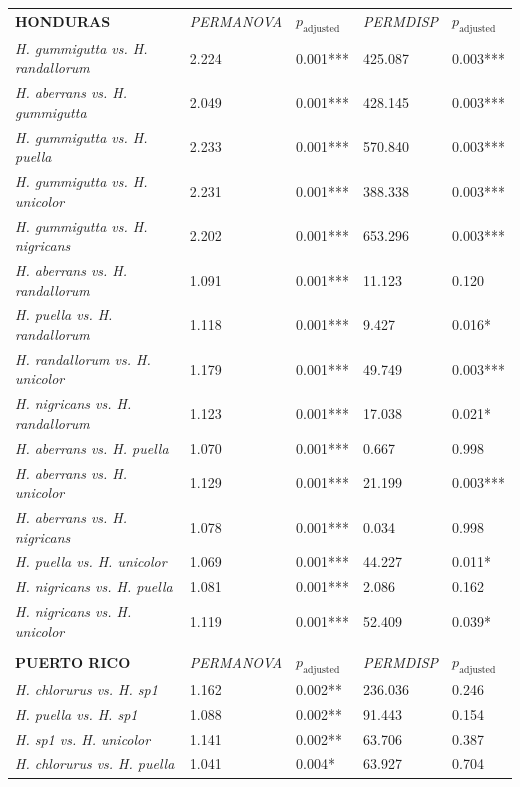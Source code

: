 \begin{xltabular}{\textwidth}{p{4.5cm}*{4}{X}}
\hline \hline
\addlinespace
\textbf{HONDURAS} & \emph{PERMANOVA} & $p_{\text{adjusted}}$ & \emph{PERMDISP} & $p_{\text{adjusted}}$ \\
\addlinespace
\hline \hline
\emph{H. gummigutta vs. H. randallorum} & 2.224 & 0.001*** & 425.087 & 0.003*** \\
\emph{H. aberrans vs. H. gummigutta} & 2.049 & 0.001*** & 428.145 & 0.003*** \\
\emph{H. gummigutta vs. H. puella} & 2.233 & 0.001*** & 570.840 & 0.003*** \\
\emph{H. gummigutta vs. H. unicolor} & 2.231 & 0.001*** & 388.338 & 0.003*** \\
\emph{H. gummigutta vs. H. nigricans} & 2.202 & 0.001*** & 653.296 & 0.003*** \\
\emph{H. aberrans vs. H. randallorum} & 1.091 & 0.001*** & 11.123 & 0.120 \\
\emph{H. puella vs. H. randallorum} & 1.118 & 0.001*** & 9.427 & 0.016* \\
\emph{H. randallorum vs. H. unicolor} & 1.179 & 0.001*** & 49.749 & 0.003*** \\
\emph{H. nigricans vs. H. randallorum} & 1.123 & 0.001*** & 17.038 & 0.021* \\
\emph{H. aberrans vs. H. puella} & 1.070 & 0.001*** & 0.667 & 0.998 \\
\emph{H. aberrans vs. H. unicolor} & 1.129 & 0.001*** & 21.199 & 0.003*** \\
\emph{H. aberrans vs. H. nigricans} & 1.078 & 0.001*** & 0.034 & 0.998 \\
\emph{H. puella vs. H. unicolor} & 1.069 & 0.001*** & 44.227 & 0.011* \\
\emph{H. nigricans vs. H. puella} & 1.081 & 0.001*** & 2.086 & 0.162 \\
\emph{H. nigricans vs. H. unicolor} & 1.119 & 0.001*** & 52.409 & 0.039* \\\\
\hline \hline
\addlinespace
\textbf{PUERTO RICO} & \emph{PERMANOVA} & $p_{\text{adjusted}}$ & \emph{PERMDISP} & $p_{\text{adjusted}}$ \\
\addlinespace
\hline \hline
\emph{H. chlorurus vs. H. sp1} & 1.162 & 0.002** & 236.036 & 0.246 \\
\emph{H. puella vs. H. sp1} & 1.088 & 0.002** & 91.443 & 0.154 \\
\emph{H. sp1 vs. H. unicolor} & 1.141 & 0.002** & 63.706 & 0.387 \\
\emph{H. chlorurus vs. H. puella} & 1.041 & 0.004* & 63.927 & 0.704 \\

\end{xltabular}
